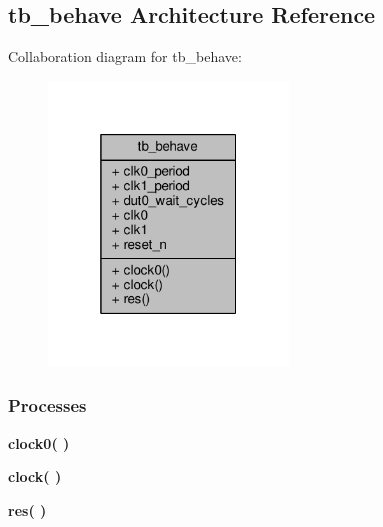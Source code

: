 \subsection{tb\+\_\+behave Architecture Reference}
\label{classpulse__gen__tb_1_1tb__behave}


Collaboration diagram for tb\+\_\+behave\+:\nopagebreak
\begin{figure}[H]
\begin{center}
\leavevmode
\includegraphics[width=181pt]{d5/d53/classpulse__gen__tb_1_1tb__behave__coll__graph}
\end{center}
\end{figure}
\subsubsection*{Processes}
 \begin{DoxyCompactItemize}
\item 
{\bf clock0}{\bfseries  (  )}
\item 
{\bf clock}{\bfseries  (  )}
\item 
{\bf res}{\bfseries  (  )}
\end{DoxyCompactItemize}
